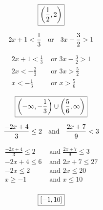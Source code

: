 \documentclass[letterpaper, landscape]{exam}
\begin{document}
\begin{questions}
\begin{solution}
        \[
          \boxed{ \intoo{ \frac{1}{2}, 2 } }
        \]

      \end{solution}

    \question[10]
      \[ 
        2x + 1 < \frac{1}{3} \text { \hspace{0.1cm} or \hspace{0.1cm} } 3x - \frac{3}{2} > 1 
      \]

      \begin{solution}
        \begin{align*}
          2x + 1 < \frac{1}{3} & \text{ or } 3x - \frac{3}{2} > 1 \\
          2x < -\frac{2}{3}    & \text{ or } 3x > \frac{5}{2} \\
          x < -\frac{1}{3}     & \text{ or } x > \frac{5}{6} \\
        \end{align*}
        \[
          \boxed{ \intoo{ -\infty, -\frac{1}{3} } \cup \intoo{ \frac{5}{6}, \infty } }
        \]
      \end{solution}

    \question[10]
      \[ 
        \frac{-2x + 4}{3} \leq 2 \text{ \hspace{0.1cm} and \hspace{0.1cm} } \frac{2x + 7}{9} < 3 
      \]

      \begin{solution}
        \begin{align*}
          \frac{-2x + 4}{3} \leq 2                   & \text{ and } \frac{2x + 7}{9} \leq 3 \\
          -2x + 4 \leq 6                             & \text{ and } 2x + 7 \leq 27 \\
          -2x \leq 2                                 & \text{ and } 2x \leq 20 \\
          x \geq -1                                   & \text{ and } x \leq 10 \\
        \end{align*}

        \[
          \boxed{ \intcc{ -1, 10 } }
        \]

      \end{solution}

    \ifprintanswers{}
      \newpage
    \fi


\end{questions}
\end{document}
